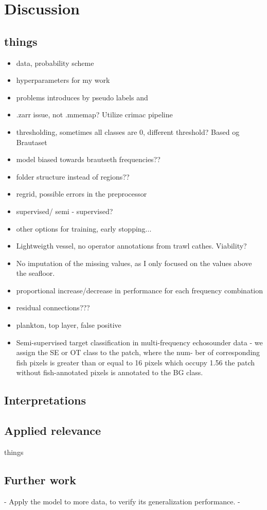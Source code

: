 \chapter{Discussion}
    \section{things}
        \begin{itemize}
            \item data, probability scheme
            \item hyperparameters for my work
            \item problems introduces by pseudo labels and 
            \item .zarr issue, not .mmemap? Utilize crimac pipeline
            \item thresholding, sometimes all classes are 0, different threshold? Based og Brautaset
            \item model biased towards brautseth frequencies??
            \item folder structure instead of regions??
            \item regrid, possible errors in the preprocessor 
            \item supervised/ semi - supervised? 
            \item other options for training, early stopping...
            \item Lightweigth vessel, no operator annotations from trawl cathes. Viability?
            \item No imputation of the missing values, as I only focused on the values above the seafloor.
            \item proportional increase/decrease in performance for each frequency combination 
            \item residual connections??? \cite{zhang2018road}
            \item plankton, top layer, false positive
            \item Semi-supervised target classification in multi-frequency
echosounder data - we assign the SE or OT class to the patch, where the num-
ber of corresponding fish pixels is greater than or equal to 16 pixels
which occupy 1.56%
the patch without fish-annotated pixels is annotated to the BG class.
        \end{itemize}

    \section{Interpretations}
    \section{Applied relevance}
        things
    
    
    \section{Further work}
        - Apply the model to more data, to verify its generalization performance.
        - 